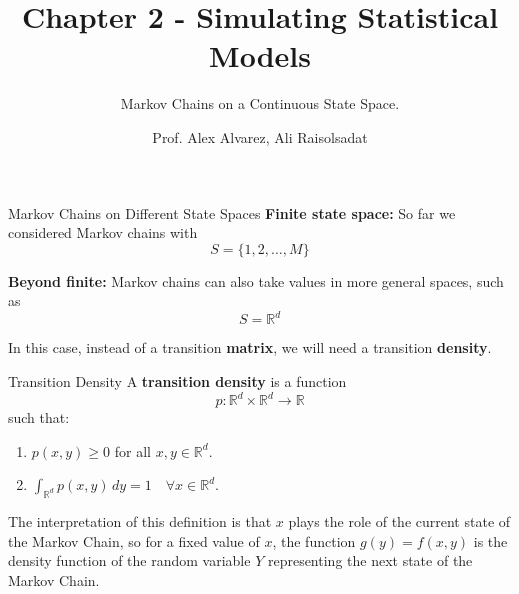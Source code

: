 \documentclass[8pt]{beamer}
\title{Chapter 2 - Simulating Statistical Models}
\subtitle{Markov Chains on a Continuous State Space.}
\author{Prof. Alex Alvarez, Ali Raisolsadat}
\institute{School of Mathematical and Computational Sciences \\ University of Prince Edward Island}
\date{} %
\begin{document}
\maketitle

\begin{frame}{Markov Chains on Different State Spaces}
\textbf{Finite state space:}  
So far we considered Markov chains with  
\begin{equation*}
S = \{1,2,\ldots, M\}
\end{equation*}

\textbf{Beyond finite:}  
Markov chains can also take values in more general spaces, such as  
\begin{equation*}
S = \mathbb{R}^d
\end{equation*}

In this case, instead of a transition \textbf{matrix}, we will need a 
transition \textbf{density}.
\end{frame}

\begin{frame}{Transition Density}
A \textbf{transition density} is a function 
\begin{equation*}
p:\mathbb{R}^d \times \mathbb{R}^d \to \mathbb{R}
\end{equation*} 
such that:
\begin{enumerate}
	\item $p(x,y) \geq 0$ for all $x,y \in \mathbb{R}^d$.
	\item $\displaystyle \int_{\mathbb{R}^d} p(x,y)\,dy = 1 \quad \forall x \in \mathbb{R}^d$.
\end{enumerate}

\vspace{3mm}

The interpretation of this definition is that $x$ plays the role of the 
current state of the Markov Chain, so for a fixed value of $x$, the function $g(y)=f(x,y)$ is the density function of the random variable $Y$ representing the next state of the Markov Chain.
\end{frame}
\end{document}
